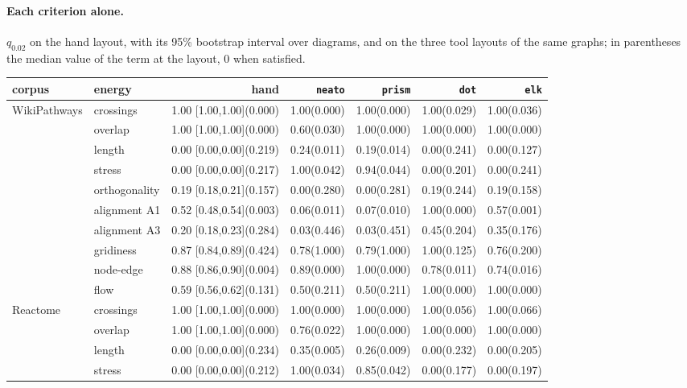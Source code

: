 \documentclass[a4paper,UKenglish]{gd-lipics-v3}
\begin{document}
\paragraph{Each criterion alone.} $q_{0.02}$ on the hand layout, with its 95\% bootstrap
interval over diagrams, and on the three tool layouts of the same graphs; in parentheses
the median value of the term at the layout, 0 when satisfied.

\begin{center}\fontsize{5.6}{6.8}\selectfont\setlength{\tabcolsep}{1.2pt}
\begin{tabular}{llrrrrr}
\toprule
corpus & energy & hand & \texttt{neato} & \texttt{prism} & \texttt{dot} & \texttt{elk} \\
\midrule
WikiPathways & crossings & 1.00 [1.00,1.00](0.000) & 1.00(0.000) & 1.00(0.000) & 1.00(0.029) & 1.00(0.036) \\
& overlap & 1.00 [1.00,1.00](0.000) & 0.60(0.030) & 1.00(0.000) & 1.00(0.000) & 1.00(0.000) \\
& length & 0.00 [0.00,0.00](0.219) & 0.24(0.011) & 0.19(0.014) & 0.00(0.241) & 0.00(0.127) \\
& stress & 0.00 [0.00,0.00](0.217) & 1.00(0.042) & 0.94(0.044) & 0.00(0.201) & 0.00(0.241) \\
& orthogonality & 0.19 [0.18,0.21](0.157) & 0.00(0.280) & 0.00(0.281) & 0.19(0.244) & 0.19(0.158) \\
& alignment A1 & 0.52 [0.48,0.54](0.003) & 0.06(0.011) & 0.07(0.010) & 1.00(0.000) & 0.57(0.001) \\
& alignment A3 & 0.20 [0.18,0.23](0.284) & 0.03(0.446) & 0.03(0.451) & 0.45(0.204) & 0.35(0.176) \\
& gridiness & 0.87 [0.84,0.89](0.424) & 0.78(1.000) & 0.79(1.000) & 1.00(0.125) & 0.76(0.200) \\
& node-edge & 0.88 [0.86,0.90](0.004) & 0.89(0.000) & 1.00(0.000) & 0.78(0.011) & 0.74(0.016) \\
& flow & 0.59 [0.56,0.62](0.131) & 0.50(0.211) & 0.50(0.211) & 1.00(0.000) & 1.00(0.000) \\
\midrule
Reactome & crossings & 1.00 [1.00,1.00](0.000) & 1.00(0.000) & 1.00(0.000) & 1.00(0.056) & 1.00(0.066) \\
& overlap & 1.00 [1.00,1.00](0.000) & 0.76(0.022) & 1.00(0.000) & 1.00(0.000) & 1.00(0.000) \\
& length & 0.00 [0.00,0.00](0.234) & 0.35(0.005) & 0.26(0.009) & 0.00(0.232) & 0.00(0.205) \\
& stress & 0.00 [0.00,0.00](0.212) & 1.00(0.034) & 0.85(0.042) & 0.00(0.177) & 0.00(0.197) \\

\end{tabular}
\end{center}
\end{document}
